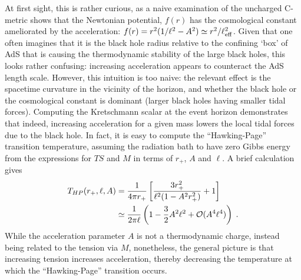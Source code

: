 \documentclass[
twoside,openright,frontopenright]{dmathesis}
\begin{document}
At first sight, this is rather curious, as a naive examination of the uncharged
C-metric shows that the Newtonian potential, $f(r)$ has the cosmological
constant ameliorated by the acceleration:
$f(r) = r^2 (1 / \ell^2 - A^2) \simeq r^2/\ell_{\rm eff}^2$. Given that one
often imagines that it is the black hole radius relative to the confining `box'
of AdS that is causing the thermodynamic stability of the large black holes,
this looks rather confusing: increasing acceleration appears to counteract the
AdS length scale. However, this intuition is too naive: the relevant effect is
the spacetime curvature in the vicinity of the horizon, and whether the black
hole or the cosmological constant is dominant (larger black holes having smaller
tidal forces). Computing the Kretschmann scalar at the event horizon
demonstrates that indeed, increasing acceleration for a given mass lowers the
local tidal forces due to the black hole.  In fact, it is easy to compute the
``Hawking-Page'' transition temperature, assuming the radiation bath to have
zero Gibbs energy from the expressions for $TS$ and $M$ in terms of $r_+$, $A$
and $\ell$. A brief calculation gives
\begin{equation}
\begin{aligned}
T_{HP} (r_+, \ell, A) &= \frac{1}{4\pi r_+ }\left [
\frac{ 3r_+^2}{\ell^2 ( 1- A^2 r_+^2) } + 1 \right ]\\
& \simeq \frac{1}{2\pi \ell} \left ( 1 - \frac32 A^2 \ell^2 + {\cal{O}} (A^4 \ell^4) \right)
\;.
\end{aligned}
\end{equation}
While the acceleration parameter $A$ is not a thermodynamic charge, instead
being related to the tension via $M$, nonetheless, the general picture is that
increasing tension increases acceleration, thereby decreasing the temperature at
which the ``Hawking-Page'' transition occurs.
\end{document}
